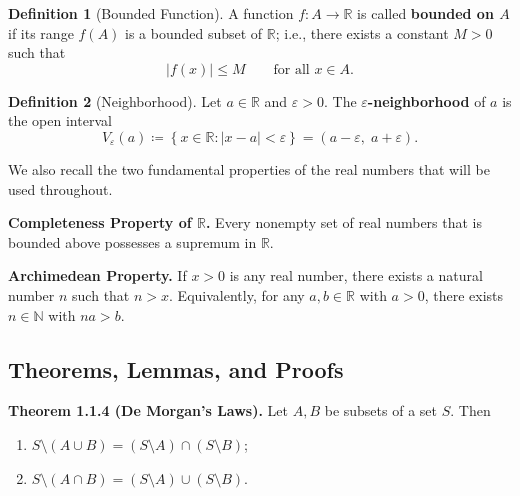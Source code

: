\documentclass[12pt,a4paper]{article}
\theoremstyle{definition}
\newtheorem*{definition}{Definition}
\newcommand{\R}{\mathbb{R}}
\newcommand{\N}{\mathbb{N}}
\newcommand{\eps}{\varepsilon}
\newcommand{\abs}[1]{\left\lvert#1\right\rvert}
\newcommand{\set}[1]{\left\{#1\right\}}
\begin{document}
\begin{definition}[Bounded Function]
A function \(f:A\to\R\) is called \textbf{bounded on \(A\)} if its range \(f(A)\) is a bounded subset of \(\R\); i.e., there exists a constant \(M>0\) such that
\[
    \abs{f(x)}\le M \qquad\text{for all } x\in A.
\]
\end{definition}

\begin{definition}[Neighborhood]
Let \(a\in\R\) and \(\eps>0\). The \textbf{\(\eps\)-neighborhood} of \(a\) is the open interval
\[
    V_\eps(a) \coloneqq \set{x\in\R : \abs{x-a}<\eps} = (a-\eps,\; a+\eps).
\]
\end{definition}

We also recall the two fundamental properties of the real numbers that will be used throughout.

\textbf{Completeness Property of \(\R\).} Every nonempty set of real numbers that is bounded above possesses a supremum in \(\R\).

\textbf{Archimedean Property.} If \(x>0\) is any real number, there exists a natural number \(n\) such that \(n>x\). Equivalently, for any \(a,b\in\R\) with \(a>0\), there exists \(n\in\N\) with \(na>b\).

\subsection{Theorems, Lemmas, and Proofs}

\textbf{Theorem 1.1.4 (De Morgan's Laws).} Let \(A,B\) be subsets of a set \(S\). Then
\begin{enumerate}[label=(\alph*)]
    \item \(S\setminus (A\cup B) = (S\setminus A)\cap (S\setminus B)\);
    \item \(S\setminus (A\cap B) = (S\setminus A)\cup (S\setminus B)\).
\end{enumerate}
\end{document}
